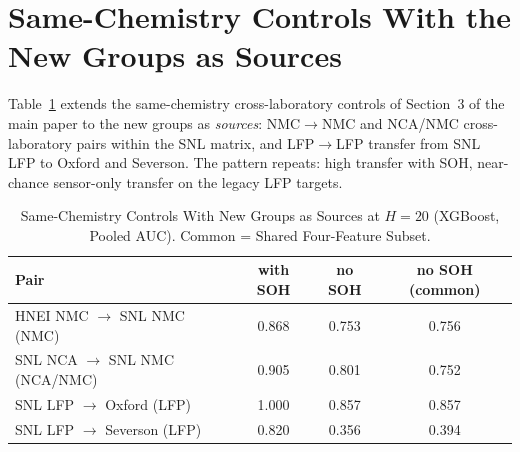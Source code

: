 \documentclass[11pt,a4paper]{article}
\begin{document}
\section{Same-Chemistry Controls With the New Groups as Sources}
Table~\ref{tab:s_samechem_ba} extends the same-chemistry cross-laboratory controls of Section~3 of the main paper to the new groups as \emph{sources}: NMC$\to$NMC and NCA/NMC cross-laboratory pairs within the SNL matrix, and LFP$\to$LFP transfer from SNL LFP to Oxford and Severson. The pattern repeats: high transfer with SOH, near-chance sensor-only transfer on the legacy LFP targets.
\begin{table}[!t]
\caption{Same-Chemistry Controls With New Groups as Sources at $H{=}20$ (XGBoost, Pooled AUC). Common = Shared Four-Feature Subset.}
\label{tab:s_samechem_ba}
\centering\footnotesize\setlength{\tabcolsep}{3pt}
\begin{tabular}{lccc}
\toprule
\textbf{Pair} & \textbf{with SOH} & \textbf{no SOH} & \textbf{no SOH (common)}\\
\midrule
HNEI NMC $\to$ SNL NMC (NMC) & 0.868 & 0.753 & 0.756\\
SNL NCA $\to$ SNL NMC (NCA/NMC) & 0.905 & 0.801 & 0.752\\
SNL LFP $\to$ Oxford (LFP) & 1.000 & 0.857 & 0.857\\
SNL LFP $\to$ Severson (LFP) & 0.820 & 0.356 & 0.394\\
\bottomrule
\end{tabular}
\end{table}
\end{document}

